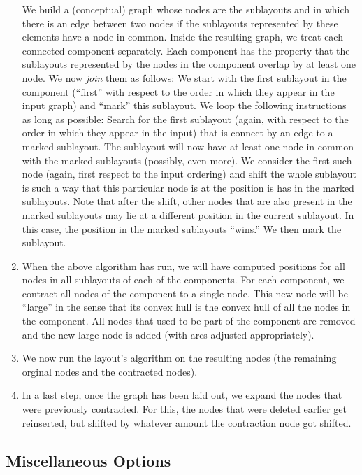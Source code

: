 \begin{enumerate}
  We build a (conceptual) graph whose nodes are the sublayouts and in
  which there is an edge between two nodes if the sublayouts
  represented by these elements have a node in common.
  Inside the resulting graph, we treat each connected component
  separately. Each component has the property that the sublayouts
  represented by the nodes in the component overlap by at least one
  node. We now \emph{join} them as follows: We start with the first
  sublayout in the component (``first'' with respect to the order in
  which they appear in the input graph) and ``mark'' this
  sublayout. We loop the following instructions as long as possible:
  Search for the first sublayout (again, with respect to the order in
  which they appear in the input) that is connect by an edge to a
  marked sublayout. The sublayout will now have at least one node in
  common with the marked sublayouts (possibly, even more). We
  consider the first such node (again, first respect to the input
  ordering) and shift the whole sublayout is such a way that this
  particular node is at the position is has in the marked
  sublayouts. Note that after the shift, other nodes that are also
  present in the marked sublayouts may lie at a different position in
  the current sublayout. In this case, the position in the marked
  sublayouts ``wins.'' We then mark the sublayout.
\item When the above algorithm has run, we will have computed
  positions for all nodes in all sublayouts of each of the
  components. For each component, we contract all
  nodes of the component to a single node. This new 
  node will be ``large'' in the sense that its convex hull is the
  convex hull of all the nodes in the component. All nodes that used
  to be part of the component are removed and the new large node is
  added (with arcs adjusted appropriately). 
\item We now run the layout's algorithm on the resulting nodes
  (the remaining orginal nodes and the contracted nodes).
\item In a last step, once the graph has been laid out, we expand the
  nodes that were previously contracted. For this, the 
  nodes that were deleted earlier get reinserted, but shifted by
  whatever amount the contraction node got shifted.
\end{enumerate}


\subsection{Miscellaneous Options}


\endinput

